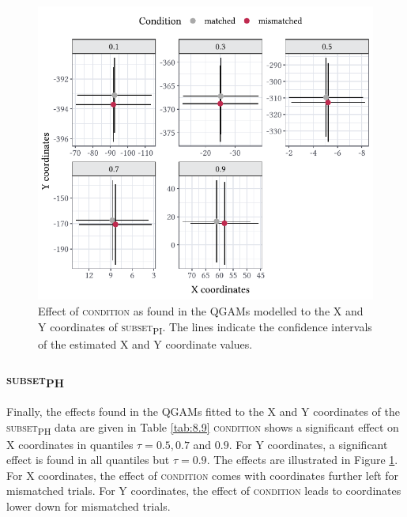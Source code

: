 \begin{figure}
    \centering
    \includegraphics[]{figures/fig8.5.pdf}
    \caption{Effect of \textsc{condition} as found in the QGAMs modelled to the X and Y coordinates of \textsc{subset\textsubscript{PI}}. The lines indicate the confidence intervals of the estimated X and Y coordinate values.}
    \label{fig:8_5}
\end{figure}

\subsubsection{\textsc{subset\textsubscript{PH}}}\label{section08_2_2_4}

Finally, the effects found in the QGAMs fitted to the X and Y coordinates of the \textsc{subset\textsubscript{PH}} data are given in Table \ref{tab:8.9} \textsc{condition} shows a significant effect on X coordinates in quantiles $\tau=0.5,0.7$ and $0.9$. For Y coordinates, a significant effect is found in all quantiles but $\tau=0.9$. The effects are illustrated in Figure \ref{fig:8_5}. For X coordinates, the effect of \textsc{condition} comes with coordinates further left for mismatched trials. For Y coordinates, the effect of \textsc{condition} leads to coordinates lower down for mismatched trials.

